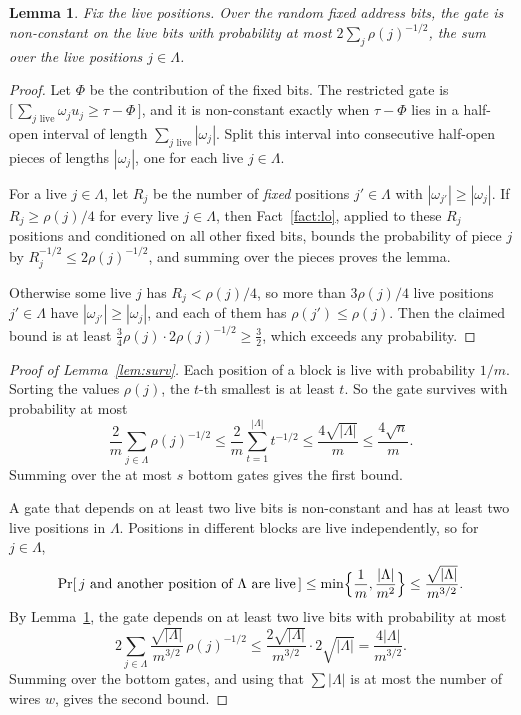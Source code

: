 \documentclass[11pt,letterpaper]{article}
\newtheorem{lemma}[theorem]{Lemma}
\theoremstyle{remark}
\newcommand{\ind}[1]{\bigl[\,#1\,\bigr]}
\begin{document}
\begin{lemma}\label{lem:onerestr}
Fix the live positions. Over the random fixed address bits, the gate is
non-constant on the live bits with probability at most
$2\sum_{j}\rho(j)^{-1/2}$, the sum over the live positions $j\in \Lambda$.
\end{lemma}
\begin{proof}
Let $\Phi$ be the contribution of the fixed bits. The restricted gate is
$\ind{\sum_{j\text{ live}}\omega_ju_j\ge\tau-\Phi}$, and it is non-constant
exactly when $\tau-\Phi$ lies in a half-open interval of length
$\sum_{j\text{ live}}|\omega_j|$. Split this interval into consecutive
half-open pieces of lengths $|\omega_j|$, one for each live $j\in \Lambda$.

For a live $j\in \Lambda$, let $R_j$ be the number of \emph{fixed} positions
$j'\in \Lambda$ with $|\omega_{j'}|\ge|\omega_j|$. If $R_j\ge\rho(j)/4$ for every live
$j\in \Lambda$, then Fact~\ref{fact:lo}, applied to these $R_j$ positions and
conditioned on all other fixed bits, bounds the probability of piece $j$ by
$R_j^{-1/2}\le2\rho(j)^{-1/2}$, and summing over the pieces proves the lemma.

Otherwise some live $j$ has $R_j<\rho(j)/4$, so more than $3\rho(j)/4$ live
positions $j'\in \Lambda$ have $|\omega_{j'}|\ge|\omega_j|$, and each of them has
$\rho(j')\le\rho(j)$. Then the claimed bound is at least
$\tfrac34\rho(j)\cdot2\rho(j)^{-1/2}\ge\tfrac32$, which exceeds any
probability.
\end{proof}

\begin{proof}[Proof of Lemma~\ref{lem:surv}]
Each position of a block is live with probability $1/m$. Sorting the values
$\rho(j)$, the $t$-th smallest is at least $t$. So the gate survives with
probability at most
\[
\frac2m\sum_{j\in \Lambda}\rho(j)^{-1/2}\le\frac2m\sum_{t=1}^{|\Lambda|}t^{-1/2}
\le\frac{4\sqrt{|\Lambda|}}{m}\le\frac{4\sqrt n}{m}.
\]
Summing over the at most $s$ bottom gates gives the first bound.

A gate that depends on at least two live bits is non-constant and has at
least two live positions in $\Lambda$. Positions in different blocks are live
independently, so for $j\in \Lambda$,
\[
\Pr[\,j\text{ and another position of }\Lambda\text{ are live}\,]
\le\min\Bigl\{\frac1m,\frac{|\Lambda|}{m^2}\Bigr\}\le\frac{\sqrt{|\Lambda|}}{m^{3/2}}.
\]
By Lemma~\ref{lem:onerestr}, the gate depends on at least two live bits with
probability at most
\[
2\sum_{j\in \Lambda}\frac{\sqrt{|\Lambda|}}{m^{3/2}}\,\rho(j)^{-1/2}
\le\frac{2\sqrt{|\Lambda|}}{m^{3/2}}\cdot2\sqrt{|\Lambda|}=\frac{4|\Lambda|}{m^{3/2}}.
\]
Summing over the bottom gates, and using that $\sum|\Lambda|$ is at most the number
of wires $w$, gives the second bound.
\end{proof}
\end{document}
